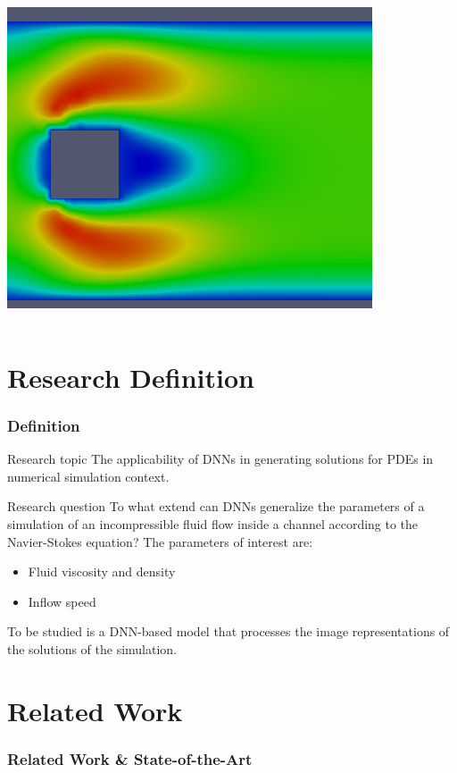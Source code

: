 \documentclass[18pt]{beamer}
\begin{document}
\begin{frame}
\begin{columns}
\begin{column}{0.5\textwidth}
\begin{center}
        \includegraphics[scale=0.3]{images/flow-4}
      \end{center}
    \end{column}
  \end{columns}
\end{frame}


\section{Research Definition}
\begin{frame}[t]
  \frametitle{Definition}
  \begin{block}{Research topic}
    The applicability of DNNs in generating solutions for PDEs in numerical simulation context.
  \end{block}
  \begin{block}{Research question}
    To what extend can DNNs generalize the parameters of a simulation of an incompressible fluid flow inside a channel according to the Navier-Stokes equation? The parameters of interest are:
    \begin{itemize}
    \item Fluid viscosity and density
    \item Inflow speed
    \end{itemize}
    To be studied is a DNN-based model that processes the image representations of the solutions of the simulation.
  \end{block}
\end{frame}


\section{Related Work}
\begin{frame}[t]
  \frametitle{Related Work \& State-of-the-Art}
  \begin{columns}[t]
    \begin{column}{0.5\textwidth}
    \end{column}
    \begin{column}{0.5\textwidth}
    \end{column}
  \end{columns}
\end{frame}
\end{document}
